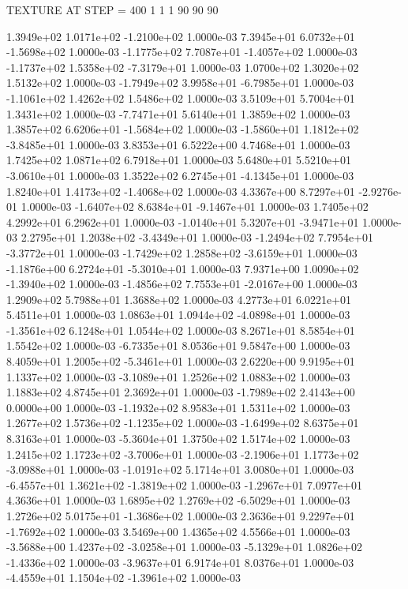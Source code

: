 TEXTURE AT STEP = 400
1 1 1
90 90 90

 1.3949e+02  1.0171e+02 -1.2100e+02  1.0000e-03
 7.3945e+01  6.0732e+01 -1.5698e+02  1.0000e-03
-1.1775e+02  7.7087e+01 -1.4057e+02  1.0000e-03
-1.1737e+02  1.5358e+02 -7.3179e+01  1.0000e-03
1.0700e+02 1.3020e+02 1.5132e+02  1.0000e-03
-1.7949e+02  3.9958e+01 -6.7985e+01  1.0000e-03
-1.1061e+02  1.4262e+02  1.5486e+02  1.0000e-03
3.5109e+01 5.7004e+01 1.3431e+02  1.0000e-03
-7.7471e+01  5.6140e+01  1.3859e+02  1.0000e-03
 1.3857e+02  6.6206e+01 -1.5684e+02  1.0000e-03
-1.5860e+01  1.1812e+02 -3.8485e+01  1.0000e-03
3.8353e+01 6.5222e+00 4.7468e+01  1.0000e-03
1.7425e+02 1.0871e+02 6.7918e+01  1.0000e-03
 5.6480e+01  5.5210e+01 -3.0610e+01  1.0000e-03
 1.3522e+02  6.2745e+01 -4.1345e+01  1.0000e-03
 1.8240e+01  1.4173e+02 -1.4068e+02  1.0000e-03
 4.3367e+00  8.7297e+01 -2.9276e-01  1.0000e-03
-1.6407e+02  8.6384e+01 -9.1467e+01  1.0000e-03
1.7405e+02 4.2992e+01 6.2962e+01  1.0000e-03
-1.0140e+01  5.3207e+01 -3.9471e+01  1.0000e-03
 2.2795e+01  1.2038e+02 -3.4349e+01  1.0000e-03
-1.2494e+02  7.7954e+01 -3.3772e+01  1.0000e-03
-1.7429e+02  1.2858e+02 -3.6159e+01  1.0000e-03
-1.1876e+00  6.2724e+01 -5.3010e+01  1.0000e-03
 7.9371e+00  1.0090e+02 -1.3940e+02  1.0000e-03
-1.4856e+02  7.7553e+01 -2.0167e+00  1.0000e-03
1.2909e+02 5.7988e+01 1.3688e+02  1.0000e-03
4.2773e+01 6.0221e+01 5.4511e+01  1.0000e-03
 1.0863e+01  1.0944e+02 -4.0898e+01  1.0000e-03
-1.3561e+02  6.1248e+01  1.0544e+02  1.0000e-03
8.2671e+01 8.5854e+01 1.5542e+02  1.0000e-03
-6.7335e+01  8.0536e+01  9.5847e+00  1.0000e-03
 8.4059e+01  1.2005e+02 -5.3461e+01  1.0000e-03
2.6220e+00 9.9195e+01 1.1337e+02  1.0000e-03
-3.1089e+01  1.2526e+02  1.0883e+02  1.0000e-03
1.1883e+02 4.8745e+01 2.3692e+01  1.0000e-03
-1.7989e+02  2.4143e+00  0.0000e+00  1.0000e-03
-1.1932e+02  8.9583e+01  1.5311e+02  1.0000e-03
 1.2677e+02  1.5736e+02 -1.1235e+02  1.0000e-03
-1.6499e+02  8.6375e+01  8.3163e+01  1.0000e-03
-5.3604e+01  1.3750e+02  1.5174e+02  1.0000e-03
 1.2415e+02  1.1723e+02 -3.7006e+01  1.0000e-03
-2.1906e+01  1.1773e+02 -3.0988e+01  1.0000e-03
-1.0191e+02  5.1714e+01  3.0080e+01  1.0000e-03
-6.4557e+01  1.3621e+02 -1.3819e+02  1.0000e-03
-1.2967e+01  7.0977e+01  4.3636e+01  1.0000e-03
 1.6895e+02  1.2769e+02 -6.5029e+01  1.0000e-03
 1.2726e+02  5.0175e+01 -1.3686e+02  1.0000e-03
 2.3636e+01  9.2297e+01 -1.7692e+02  1.0000e-03
3.5469e+00 1.4365e+02 4.5566e+01  1.0000e-03
-3.5688e+00  1.4237e+02 -3.0258e+01  1.0000e-03
-5.1329e+01  1.0826e+02 -1.4336e+02  1.0000e-03
-3.9637e+01  6.9174e+01  8.0376e+01  1.0000e-03
-4.4559e+01  1.1504e+02 -1.3961e+02  1.0000e-03
